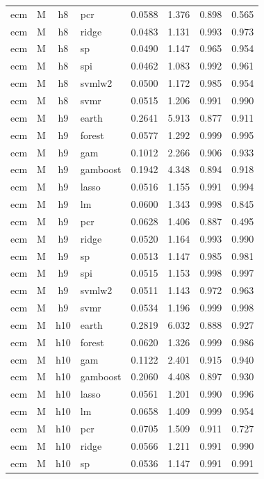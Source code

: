 \begin{ThreePartTable}
\begin{longtable}[t]{llclcccc}
ecm & M & h8 & pcr & 0.0588 & 1.376 & 0.898 & 0.565\\
ecm & M & h8 & ridge & 0.0483 & 1.131 & 0.993 & 0.973\\
ecm & M & h8 & sp & 0.0490 & 1.147 & 0.965 & 0.954\\
ecm & M & h8 & spi & 0.0462 & 1.083 & 0.992 & 0.961\\
ecm & M & h8 & svmlw2 & 0.0500 & 1.172 & 0.985 & 0.954\\
ecm & M & h8 & svmr & 0.0515 & 1.206 & 0.991 & 0.990\\
\addlinespace
ecm & M & h9 & earth & 0.2641 & 5.913 & 0.877 & 0.911\\
ecm & M & h9 & forest & 0.0577 & 1.292 & 0.999 & 0.995\\
ecm & M & h9 & gam & 0.1012 & 2.266 & 0.906 & 0.933\\
ecm & M & h9 & gamboost & 0.1942 & 4.348 & 0.894 & 0.918\\
ecm & M & h9 & lasso & 0.0516 & 1.155 & 0.991 & 0.994\\
ecm & M & h9 & lm & 0.0600 & 1.343 & 0.998 & 0.845\\
ecm & M & h9 & pcr & 0.0628 & 1.406 & 0.887 & 0.495\\
ecm & M & h9 & ridge & 0.0520 & 1.164 & 0.993 & 0.990\\
ecm & M & h9 & sp & 0.0513 & 1.147 & 0.985 & 0.981\\
ecm & M & h9 & spi & 0.0515 & 1.153 & 0.998 & 0.997\\
ecm & M & h9 & svmlw2 & 0.0511 & 1.143 & 0.972 & 0.963\\
ecm & M & h9 & svmr & 0.0534 & 1.196 & 0.999 & 0.998\\
\addlinespace
ecm & M & h10 & earth & 0.2819 & 6.032 & 0.888 & 0.927\\
ecm & M & h10 & forest & 0.0620 & 1.326 & 0.999 & 0.986\\
ecm & M & h10 & gam & 0.1122 & 2.401 & 0.915 & 0.940\\
ecm & M & h10 & gamboost & 0.2060 & 4.408 & 0.897 & 0.930\\
ecm & M & h10 & lasso & 0.0561 & 1.201 & 0.990 & 0.996\\
ecm & M & h10 & lm & 0.0658 & 1.409 & 0.999 & 0.954\\
ecm & M & h10 & pcr & 0.0705 & 1.509 & 0.911 & 0.727\\
ecm & M & h10 & ridge & 0.0566 & 1.211 & 0.991 & 0.990\\
ecm & M & h10 & sp & 0.0536 & 1.147 & 0.991 & 0.991\\

\end{longtable}
\end{ThreePartTable}
